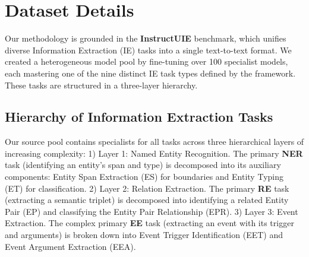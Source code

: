 
\section{Dataset Details}
\label{sec: Dataset Details and Evalution}

Our methodology is grounded in the \textbf{InstructUIE} benchmark, which unifies diverse Information Extraction (IE) tasks into a single text-to-text format. We created a heterogeneous model pool by fine-tuning over 100 specialist models, each mastering one of the nine distinct IE task types defined by the framework. These tasks are structured in a three-layer hierarchy.

\subsection*{Hierarchy of Information Extraction Tasks}

Our source pool contains specialists for all tasks across three hierarchical layers of increasing complexity:
1) Layer 1: Named Entity Recognition. The primary \textbf{NER} task (identifying an entity's span and type) is decomposed into its auxiliary components: Entity Span Extraction (ES) for boundaries and Entity Typing (ET) for classification.
2) Layer 2: Relation Extraction. The primary \textbf{RE} task (extracting a semantic triplet) is decomposed into identifying a related Entity Pair (EP) and classifying the Entity Pair Relationship (EPR).
3) Layer 3: Event Extraction. The complex primary \textbf{EE} task (extracting an event with its trigger and arguments) is broken down into Event Trigger Identification (EET) and Event Argument Extraction (EEA).

